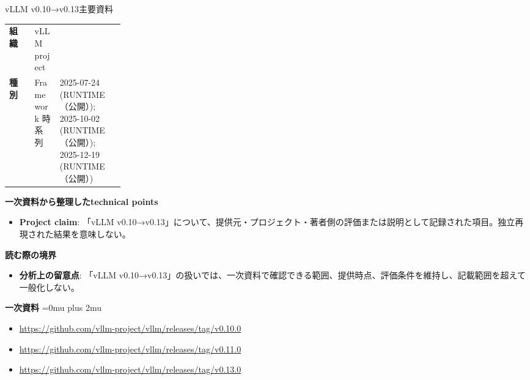 \begin{technicalnote}{vLLM v0.10→v0.13}{主要資料}
\begingroup
\begin{tabularx}{\linewidth}{@{}>{\bfseries}p{0.22\linewidth}X@{}}
組織 & vLLM project \\
種別 & Framework
時系列 & 2025-07-24 (RUNTIME（公開）); 2025-10-02 (RUNTIME（公開）); 2025-12-19 (RUNTIME（公開）) \\
\end{tabularx}
\smallskip
{\bfseries 一次資料から整理したtechnical points}
\begin{itemize}[leftmargin=1.5em,itemsep=0.35em]
\item \textbf{Project claim}: 「vLLM v0.10→v0.13」について、提供元・プロジェクト・著者側の評価または説明として記録された項目。独立再現された結果を意味しない。
\end{itemize}
\begin{minipage}{\linewidth}
{\bfseries 読む際の境界}
\begin{itemize}[leftmargin=1.5em,itemsep=0.35em]
\item \textbf{分析上の留意点}: 「vLLM v0.10→v0.13」の扱いでは、一次資料で確認できる範囲、提供時点、評価条件を維持し、記載範囲を超えて一般化しない。
\end{itemize}
\begin{samepage}
{\bfseries 一次資料}
\begingroup\sloppy
\Urlmuskip=0mu plus 2mu\relax
\begin{itemize}[leftmargin=1.5em,itemsep=0.25em]
\item {\scriptsize\url{https://github.com/vllm-project/vllm/releases/tag/v0.10.0}}
\item {\scriptsize\url{https://github.com/vllm-project/vllm/releases/tag/v0.11.0}}
\item {\scriptsize\url{https://github.com/vllm-project/vllm/releases/tag/v0.13.0}}
\end{itemize}
\endgroup
\end{samepage}
\end{minipage}
\endgroup
\end{technicalnote}
\medskip

